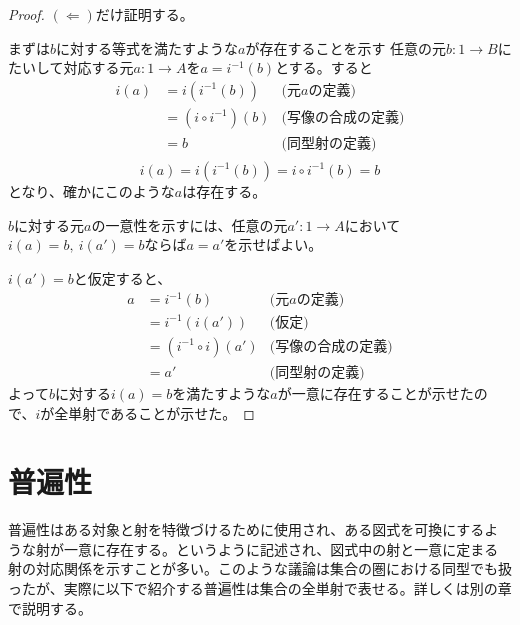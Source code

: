 \documentclass[dvipdfmx]{jsarticle}
\newcommand{\arrow}{\rightarrow}
\newcommand{\mor}[3]{#1:#2\arrow #3}
\newtheorem{proof}{証明}[section]
\numberwithin{proof}{subsection}
\numberwithin{prop}{subsection}
\numberwithin{define}{subsection}
\begin{document}
	\begin{proof}
		$(\Longleftarrow)$だけ証明する。


		まずは$b$に対する等式を満たすような$a$が存在することを示す
		任意の元$\mor{b}{1}{B}$にたいして対応する元$\mor{a}{1}{A}$を$a=i^{-1}(b)$とする。すると
		\begin{align*}
			i(a)&=i(i^{-1}(b))&\text{(元$a$の定義)}\\
			&=(i\circ i^{-1})(b)&\text{(写像の合成の定義)}\\
			&=b&\text{(同型射の定義)}\\
		\end{align*}
		\[i(a)=i(i^{-1}(b))=i\circ i^{-1}(b)=b\]となり、確かにこのような$a$は存在する。

		$b$に対する元$a$の一意性を示すには、任意の元$\mor{a'}{1}{A}$において$i(a)=b,\ i(a')=b$ならば$a=a'$を示せばよい。

		$i(a')=b$と仮定すると、
		\begin{align*}
			a&=i^{-1}(b)&\text{(元$a$の定義)}\\
			　&=i^{-1}(i(a'))&\text{(仮定)}\\
			　&=(i^{-1}\circ i)(a')&\text{(写像の合成の定義)}\\
			　&=a'&\text{(同型射の定義)}
		\end{align*}
		よって$b$に対する$i(a)=b$を満たすような$a$が一意に存在することが示せたので、$i$が全単射であることが示せた。
	\end{proof}
	\section{普遍性}
	普遍性はある対象と射を特徴づけるために使用され、ある図式を可換にするような射が一意に存在する。というように記述され、図式中の射と一意に定まる射の対応関係を示すことが多い。このような議論は集合の圏における同型でも扱ったが、実際に以下で紹介する普遍性は集合の全単射で表せる。詳しくは別の章で説明する。
\end{document}
